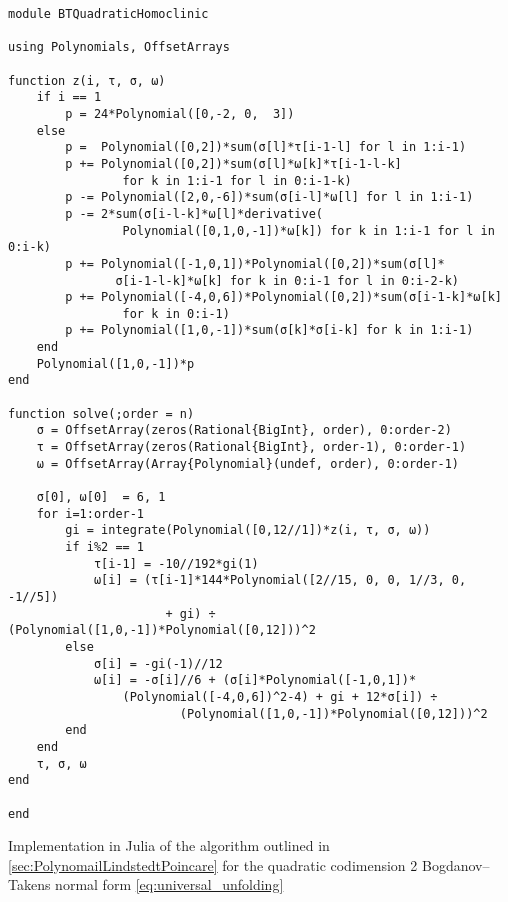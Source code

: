 \begin{code}
\begin{verbatim}
module BTQuadraticHomoclinic

using Polynomials, OffsetArrays

function z(i, τ, σ, ω)
    if i == 1
        p = 24*Polynomial([0,-2, 0,  3])
    else
        p =  Polynomial([0,2])*sum(σ[l]*τ[i-1-l] for l in 1:i-1)
        p += Polynomial([0,2])*sum(σ[l]*ω[k]*τ[i-1-l-k] 
                for k in 1:i-1 for l in 0:i-1-k)
        p -= Polynomial([2,0,-6])*sum(σ[i-l]*ω[l] for l in 1:i-1)
        p -= 2*sum(σ[i-l-k]*ω[l]*derivative(
                Polynomial([0,1,0,-1])*ω[k]) for k in 1:i-1 for l in 0:i-k)
        p += Polynomial([-1,0,1])*Polynomial([0,2])*sum(σ[l]*
               σ[i-1-l-k]*ω[k] for k in 0:i-1 for l in 0:i-2-k)
        p += Polynomial([-4,0,6])*Polynomial([0,2])*sum(σ[i-1-k]*ω[k]
                for k in 0:i-1)
        p += Polynomial([1,0,-1])*sum(σ[k]*σ[i-k] for k in 1:i-1)
    end
    Polynomial([1,0,-1])*p
end

function solve(;order = n)
    σ = OffsetArray(zeros(Rational{BigInt}, order), 0:order-2)
    τ = OffsetArray(zeros(Rational{BigInt}, order-1), 0:order-1)
    ω = OffsetArray(Array{Polynomial}(undef, order), 0:order-1)

    σ[0], ω[0]  = 6, 1
    for i=1:order-1
        gi = integrate(Polynomial([0,12//1])*z(i, τ, σ, ω))
        if i%2 == 1
            τ[i-1] = -10//192*gi(1)
            ω[i] = (τ[i-1]*144*Polynomial([2//15, 0, 0, 1//3, 0, -1//5]) 
                      + gi) ÷ (Polynomial([1,0,-1])*Polynomial([0,12]))^2
        else
            σ[i] = -gi(-1)//12
            ω[i] = -σ[i]//6 + (σ[i]*Polynomial([-1,0,1])*
                (Polynomial([-4,0,6])^2-4) + gi + 12*σ[i]) ÷ 
                        (Polynomial([1,0,-1])*Polynomial([0,12]))^2
        end
    end
    τ, σ, ω
end

end
\end{verbatim}
\caption{Implementation in Julia of the algorithm outlined in
\cref{sec:PolynomailLindstedtPoincare} for the quadratic codimension 2
Bogdanov--Takens normal form \cref{eq:universal_unfolding}}
\label{lst:BTQuadraticHomoclinic}
\end{code}

